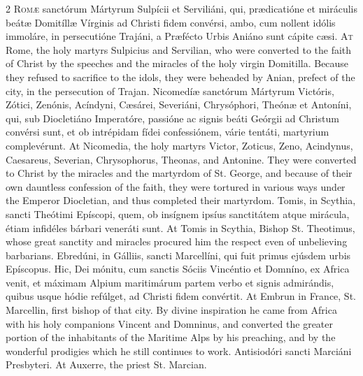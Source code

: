 \begin{paracol}{2}
\lettrine[lines=2]{R}{omæ} sanctórum 
 Mártyrum Sulpícii et Serviliáni, qui, prædicatióne et miráculis beátæ 
 Domitíllæ Vírginis ad Christi fidem convérsi, ambo, cum nollent idólis 
 immoláre, in persecutióne Trajáni, a Præfécto Urbis Aniáno sunt cápite cæsi.
\switchcolumn
{}
\lettrine[lines=2]{A}{t} Rome, the holy martyrs Sulpicius 
 and Servilian, who were converted to the faith of Christ by the speeches and 
 the miracles of the holy virgin Domitilla. Because they refused to 
 sacrifice to the idols, they were beheaded by Anian, prefect of the city, in 
 the persecution of Trajan.
\switchcolumn*
{}
Nicomedíæ sanctórum 
 Mártyrum Victóris, Zótici, Zenónis, Acíndyni, Cæsárei, Severiáni, 
 Chrysóphori, Theónæ et Antoníni, qui, sub Diocletiáno Imperatóre, passióne 
 ac signis beáti Geórgii ad Christum convérsi sunt, et ob intrépidam fídei 
 confessiónem, várie tentáti, martyrium complevérunt.
\switchcolumn
{}
At Nicomedia, the holy martyrs 
 Victor, Zoticus, Zeno, Acindynus, Caesareus, Severian, Chrysophorus, Theonas, 
 and Antonine. They were converted to Christ by the miracles and the 
 martyrdom of St. George, and because of their own dauntless confession of 
 the faith, they were tortured in various ways under the Emperor Diocletian, 
 and thus completed their martyrdom.
\switchcolumn*
{}
Tomis, in Scythia, 
 sancti Theótimi Epíscopi, quem, ob insígnem ipsíus sanctitátem atque 
 mirácula, étiam infidéles bárbari veneráti sunt.
\switchcolumn
{}
At Tomis in Scythia, Bishop St. 
 Theotimus, whose great sanctity and miracles procured him the respect even 
 of unbelieving barbarians.
\switchcolumn*
{}
Ebredúni, in Gálliis, 
 sancti Marcellíni, qui fuit primus ejúsdem urbis Epíscopus. Hic, Dei 
 mónitu, cum sanctis Sóciis Vincéntio et Domníno, ex Africa venit, et máximam 
 Alpium maritimárum partem verbo et signis admirándis, quibus usque hódie 
 refúlget, ad Christi fidem convértit.
\switchcolumn
{}
At Embrun in France, St. Marcellin, 
 first bishop of that city. By divine inspiration he came from Africa 
 with his holy companions Vincent and Domninus, and converted the greater 
 portion of the inhabitants of the Maritime Alps by his preaching, and by the 
 wonderful prodigies which he still continues to work.
\switchcolumn*
{}
Antisiodóri sancti 
 Marciáni Presbyteri.
\switchcolumn
{}
At Auxerre, the priest St. Marcian.

\end{paracol}
